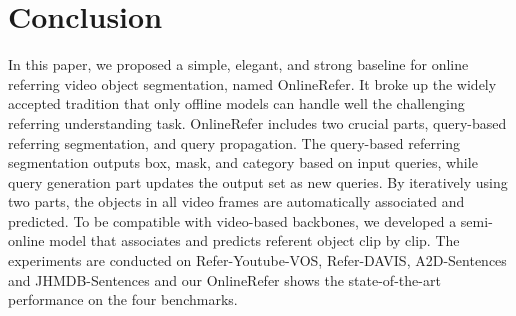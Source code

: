 \documentclass[10pt,twocolumn,letterpaper]{article}
\begin{document}
\section{Conclusion}



In this paper, we proposed a simple, elegant, and strong baseline for online referring video object segmentation, named OnlineRefer.
It broke up the widely accepted tradition that only offline models can handle well the challenging referring understanding task.
OnlineRefer includes two crucial parts, query-based referring segmentation, and query propagation.
The query-based referring segmentation outputs box, mask, and category based on input queries, while query generation part updates the output set as new queries.
By iteratively using two parts, the objects in all video frames are automatically associated and predicted.
To be compatible with video-based backbones, we developed a semi-online model that associates and predicts referent object clip by clip.
The experiments are conducted on Refer-Youtube-VOS, Refer-DAVIS, A2D-Sentences and JHMDB-Sentences and our OnlineRefer  shows the state-of-the-art performance on the four benchmarks.


{\small


}
\end{document}
